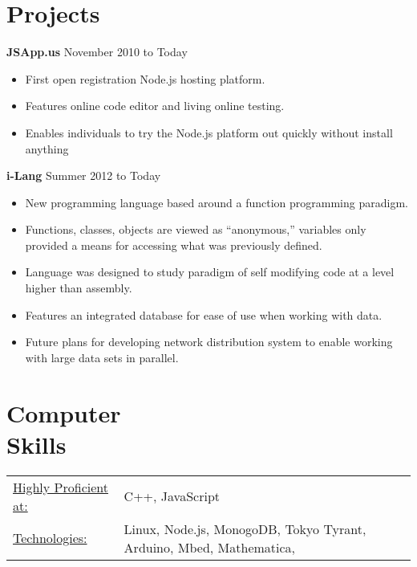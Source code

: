 \documentclass[margin]{res}
\begin{document}
\begin{resume}
\section{Projects}
{\bf JSApp.us} \hfill November 2010 to Today
\begin{itemize} \itemsep -2pt
  \item First open registration Node.js hosting platform.
  \item Features online code editor and living online testing.
  \item Enables individuals to try the Node.js platform out quickly without install anything
\end{itemize}

{\bf i-Lang} \hfill Summer 2012 to Today
\begin{itemize} \itemsep -2pt
  \item New programming language based around a function programming paradigm.
  \item Functions, classes, objects are viewed as ``anonymous,'' variables only provided a means for accessing what was previously defined.
  \item Language was designed to study paradigm of self modifying code at a level higher than assembly.
  \item Features an integrated database for ease of use when working with data.
  \item Future plans for developing network distribution system to enable working with large data sets in parallel.
\end{itemize}

\section{Computer \\ Skills}
   \begin{tabular}{l p{3in}}
    \underline{Highly Proficient at:} & C++, JavaScript \\

     \underline{Technologies:} & Linux, Node.js, MonogoDB, Tokyo Tyrant, Arduino, Mbed, Mathematica,
 \end{tabular}

\end{resume}
\end{document}
